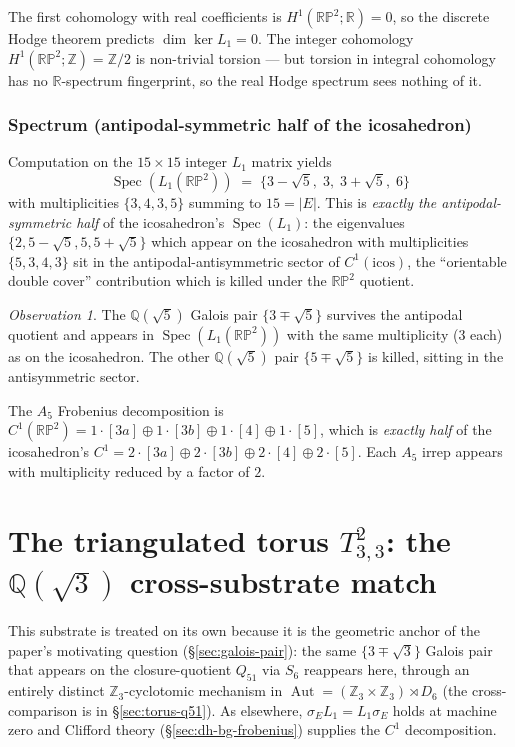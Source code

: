 \documentclass[12pt,a4paper]{article}
\theoremstyle{definition}
\theoremstyle{remark}
\newtheorem{observation}[theorem]{Observation}
\newcommand{\bZ}{\mathbb{Z}}
\newcommand{\bR}{\mathbb{R}}
\newcommand{\bQ}{\mathbb{Q}}                %
\DeclareMathOperator{\Aut}{Aut}
\DeclareMathOperator{\Spec}{Spec}
\begin{document}
The first cohomology with real coefficients is $H^1(\mathbb{RP}^2; \bR) = 0$,
so the discrete Hodge theorem predicts $\dim \ker L_1 = 0$. The
integer cohomology $H^1(\mathbb{RP}^2; \bZ) = \bZ/2$ is non-trivial
torsion --- but torsion in integral cohomology has no $\bR$-spectrum
fingerprint, so the real Hodge spectrum sees nothing of it.

\subsubsection{Spectrum (antipodal-symmetric half of the icosahedron)}\label{sec:rp2-spectrum}

Computation on the $15 \times 15$ integer $L_1$ matrix yields
\[
  \Spec(L_1(\mathbb{RP}^2)) \;=\; \{3 - \sqrt 5,\; 3,\; 3 + \sqrt 5,\; 6\}
\]
with multiplicities $\{3, 4, 3, 5\}$ summing to $15 = |E|$. This is
\emph{exactly the antipodal-symmetric half} of the icosahedron's
$\Spec(L_1)$: the eigenvalues $\{2, 5 - \sqrt 5, 5, 5 + \sqrt 5\}$
which appear on the icosahedron with multiplicities $\{5, 3, 4, 3\}$
sit in the antipodal-antisymmetric sector of $C^1(\text{icos})$, the
``orientable double cover'' contribution which is killed under the
$\mathbb{RP}^2$ quotient.

\begin{observation}
The $\bQ(\sqrt 5)$ Galois pair $\{3 \mp \sqrt 5\}$ survives the
antipodal quotient and appears in $\Spec(L_1(\mathbb{RP}^2))$ with
the same multiplicity (3 each) as on the icosahedron. The other
$\bQ(\sqrt 5)$ pair $\{5 \mp \sqrt 5\}$ is killed, sitting in the
antisymmetric sector.
\end{observation}

The $A_5$ Frobenius decomposition is $C^1(\mathbb{RP}^2) = 1 \cdot [3a]
\oplus 1 \cdot [3b] \oplus 1 \cdot [4] \oplus 1 \cdot [5]$, which is
\emph{exactly half} of the icosahedron's $C^1 = 2 \cdot [3a] \oplus 2
\cdot [3b] \oplus 2 \cdot [4] \oplus 2 \cdot [5]$. Each $A_5$ irrep
appears with multiplicity reduced by a factor of $2$.

\section{The triangulated torus $T^2_{3,3}$: the $\bQ(\sqrt 3)$
cross-substrate match}\label{sec:torus}

This substrate is treated on its own because it is the geometric anchor
of the paper's motivating question (\S\ref{sec:galois-pair}): the same
$\{3 \mp \sqrt 3\}$ Galois pair that appears on the closure-quotient
$Q_{51}$ via $S_6$ reappears here, through an entirely distinct
$\bZ_3$-cyclotomic mechanism in $\Aut = (\bZ_3 \times \bZ_3) \rtimes D_6$
(the cross-comparison is in \S\ref{sec:torus-q51}). As elsewhere,
$\sigma_E L_1 = L_1 \sigma_E$ holds at machine zero and Clifford theory
(\S\ref{sec:dh-bg-frobenius}) supplies the $C^1$ decomposition.
\end{document}
